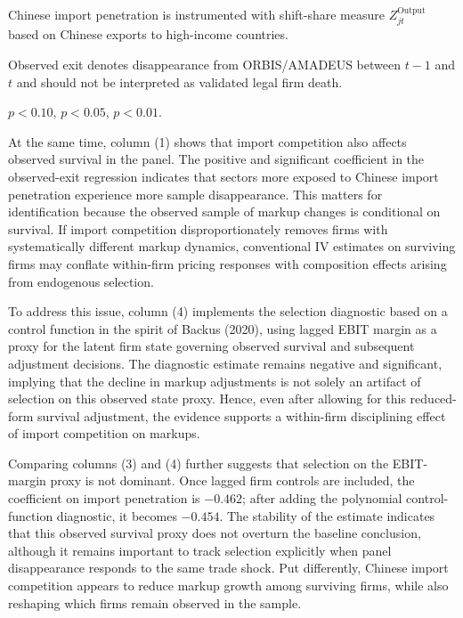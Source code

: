﻿\documentclass[12pt]{article}
\begin{document}
\begin{table}[htbp]
\begin{threeparttable}
\begin{tablenotes}[flushleft]
    \item Chinese import penetration is instrumented with shift-share measure $Z_{jt}^{\text{Output}}$ based on Chinese exports to high-income countries.
    \item Observed exit denotes disappearance from ORBIS/AMADEUS between $t-1$ and $t$ and should not be interpreted as validated legal firm death.
    \item \sym{*} \(p<0.10\), \sym{**} \(p<0.05\), \sym{***} \(p<0.01\).
    \end{tablenotes}
    \end{threeparttable}
    \end{table}

At the same time, column (1) shows that import competition also affects observed survival in the panel. The positive and significant coefficient in the observed-exit regression indicates that sectors more exposed to Chinese import penetration experience more sample disappearance. This matters for identification because the observed sample of markup changes is conditional on survival. If import competition disproportionately removes firms with systematically different markup dynamics, conventional IV estimates on surviving firms may conflate within-firm pricing responses with composition effects arising from endogenous selection.

To address this issue, column (4) implements the selection diagnostic based on a control function in the spirit of Backus (2020), using lagged EBIT margin as a proxy for the latent firm state governing observed survival and subsequent adjustment decisions. The diagnostic estimate remains negative and significant, implying that the decline in markup adjustments is not solely an artifact of selection on this observed state proxy. Hence, even after allowing for this reduced-form survival adjustment, the evidence supports a within-firm disciplining effect of import competition on markups.

Comparing columns (3) and (4) further suggests that selection on the EBIT-margin proxy is not dominant. Once lagged firm controls are included, the coefficient on import penetration is $-0.462$; after adding the polynomial control-function diagnostic, it becomes $-0.454$. The stability of the estimate indicates that this observed survival proxy does not overturn the baseline conclusion, although it remains important to track selection explicitly when panel disappearance responds to the same trade shock. Put differently, Chinese import competition appears to reduce markup growth among surviving firms, while also reshaping which firms remain observed in the sample.
\end{document}
